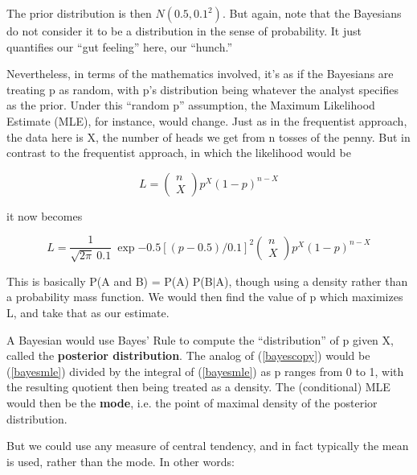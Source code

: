 The prior distribution is then $N(0.5,0.1^2)$.  But again, note that the
Bayesians do not consider it to be a distribution in the sense of
probability.  It just quantifies our ``gut feeling'' here, our
``hunch.''  


Nevertheless, in terms of the mathematics involved, it's as if the
Bayesians are treating p as random, with p's distribution being whatever
the analyst specifies as the prior.  Under this ``random p'' assumption,
the Maximum Likelihood Estimate (MLE), for instance, would change.  Just
as in the frequentist approach, the data here is X, the number of heads
we get from n tosses of the penny.  But in contrast to the frequentist
approach, in which the likelihood would be

\begin{equation}
L = \left (
\begin{array}{c}
n \\
X 
\end{array}
\right )
p^X (1-p)^{n-X}
\end{equation}

it now becomes

\begin{equation}
\label{bayesmle}
L = \frac{1}{\sqrt{2\pi} ~ 0.1} ~ \exp{-0.5 [(p-0.5)/0.1]^2}
\left (
\begin{array}{c}
n \\
X 
\end{array}
\right )
p^X (1-p)^{n-X}
\end{equation}

This is basically P(A and B) = P(A) P(B$|$A), though using a density
rather than a probability mass function.  We would then find the value of
p which maximizes L, and take that as our estimate.  

A Bayesian would use Bayes' Rule to compute the ``distribution'' of p
given X, called the {\bf posterior distribution}.  The analog of
(\ref{bayescopy}) would be (\ref{bayesmle}) divided by the integral of
(\ref{bayesmle}) as p ranges from 0 to 1, with the resulting quotient
then being treated as a density.  The (conditional) MLE would then be
the {\bf mode}, i.e. the point of maximal density of the posterior
distribution.  

But we could use any measure of central tendency, and in fact typically
the mean is used, rather than the mode.  In other words:

